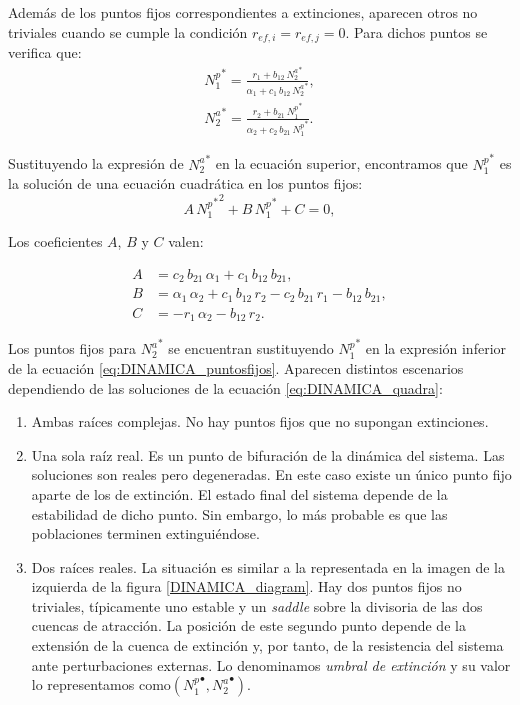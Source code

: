 Además de los puntos fijos correspondientes a extinciones, aparecen otros no triviales cuando se cumple la condición $r_{ef,i} = r_{ef,j} = 0$. Para dichos puntos se verifica que: 
\begin{align}
{N^p_{1}}^* = \frac{ r_{1}+ b_{12} \, {N^a_{2}}^* }{\alpha_{1}+ c_{1}\, b_{12}\, {N^a_{2}}^* } , \nonumber\\ 
{N^a_{2}}^* = \frac{ r_{2}+ b_{21}\, {N^p_{1}}^* }{\alpha_{2}+ c_{2} \, b_{21}\, {N^p_{1}}^* } .
\label{eq:DINAMICA_puntosfijos}
\end{align}

Sustituyendo la expresión de ${N^{a}_2}^*$ en la ecuación superior, encontramos que ${N^p_1}^*$ es la solución de una ecuación cuadrática en los puntos fijos: 
\begin{equation}
A\, {{N^p_1}^*}^2 + B \, {N^p_1}^* + C=0 ,
\label{eq:DINAMICA_quadra}
\end{equation}

Los coeficientes $A$, $B$ y $C$ valen:

\begin{align}
\displaystyle A &= c_{2}\, b_{21}\, \alpha_{1}+c_{1}\, b_{12}\, b_{21} , \nonumber \\
\displaystyle B &= \alpha_{1}\, \alpha_{2}+ c_{1}\, b_{12}\, r_{2} - c_{2}\, b_{21}\, r_{1} - b_{12}\, b_{21} ,\nonumber\\
\displaystyle C &= - r _{1}\, \alpha_{2} - b_{12}\, r_{2} .
\label{eq:DINAMICA_puntos_n1}
\end{align}

Los puntos fijos para ${N^a_2}^*$ se encuentran sustituyendo ${N^p_1}^*$ en la expresión inferior de la ecuación \ref{eq:DINAMICA_puntosfijos}. Aparecen distintos escenarios dependiendo de las soluciones de la ecuación \ref{eq:DINAMICA_quadra}:

\begin{enumerate}
\item Ambas raíces complejas. No hay puntos fijos que no supongan extinciones.
\item Una sola raíz real. Es un punto de bifuración de la dinámica del sistema. Las soluciones son reales pero degeneradas. En este caso existe un único punto fijo aparte de los de extinción. El estado final del sistema depende de la estabilidad de dicho punto. Sin embargo, lo más probable es que las poblaciones terminen extinguiéndose.
\item Dos raíces reales. La situación es similar a la representada en la imagen de la izquierda de la figura \ref{DINAMICA_diagram}. Hay dos puntos fijos no triviales, típicamente uno estable y un \textit{saddle} sobre la divisoria de las dos cuencas de atracción. La posición de este segundo punto depende de la extensión de la cuenca de extinción y, por tanto, de la resistencia del sistema ante perturbaciones externas. Lo denominamos \textit{umbral de extinción} y su valor lo representamos como$({N_{1}^{p}}^\bullet,{N_{2}^{a}}^\bullet)$.
\end{enumerate}

